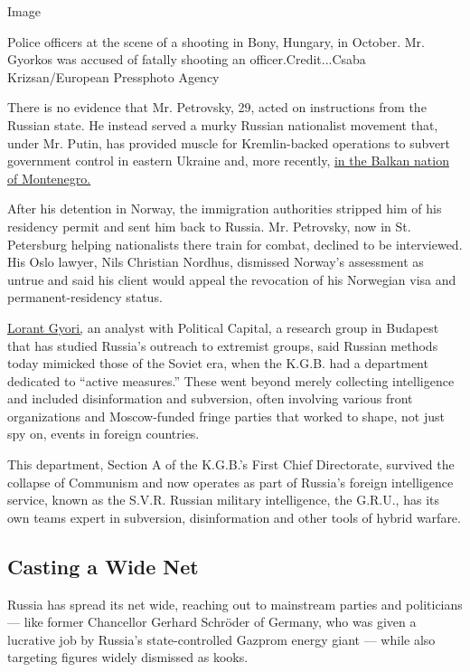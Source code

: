 Image

Police officers at the scene of a shooting in Bony, Hungary, in October.
Mr. Gyorkos was accused of fatally shooting an officer.Credit...Csaba
Krizsan/European Pressphoto Agency

There is no evidence that Mr. Petrovsky, 29, acted on instructions from
the Russian state. He instead served a murky Russian nationalist
movement that, under Mr. Putin, has provided muscle for Kremlin-backed
operations to subvert government control in eastern Ukraine and, more
recently,
\href{http://www.nytimes.com/2016/11/26/world/europe/finger-pointed-at-russians-in-alleged-coup-plot-in-montenegro.html}{in
the Balkan nation of Montenegro.}

After his detention in Norway, the immigration authorities stripped him
of his residency permit and sent him back to Russia. Mr. Petrovsky, now
in St. Petersburg helping nationalists there train for combat, declined
to be interviewed. His Oslo lawyer, Nils Christian Nordhus, dismissed
Norway's assessment as untrue and said his client would appeal the
revocation of his Norwegian visa and permanent-residency status.

\href{https://cz.boell.org/sites/default/files/pc_sdi_boll_study_iameurasian.pdf}{Lorant
Gyori,} an analyst with Political Capital, a research group in Budapest
that has studied Russia's outreach to extremist groups, said Russian
methods today mimicked those of the Soviet era, when the K.G.B. had a
department dedicated to ``active measures.'' These went beyond merely
collecting intelligence and included disinformation and subversion,
often involving various front organizations and Moscow-funded fringe
parties that worked to shape, not just spy on, events in foreign
countries.

This department, Section A of the K.G.B.'s First Chief Directorate,
survived the collapse of Communism and now operates as part of Russia's
foreign intelligence service, known as the S.V.R. Russian military
intelligence, the G.R.U., has its own teams expert in subversion,
disinformation and other tools of hybrid warfare.

\hypertarget{casting-a-wide-net}{%
\subsection{Casting a Wide Net}\label{casting-a-wide-net}}

Russia has spread its net wide, reaching out to mainstream parties and
politicians --- like former Chancellor Gerhard Schröder of Germany, who
was given a lucrative job by Russia's state-controlled Gazprom energy
giant --- while also targeting figures widely dismissed as kooks.

